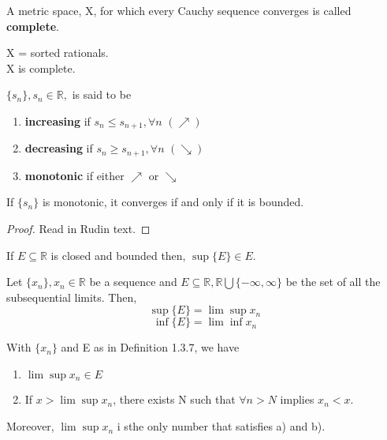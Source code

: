 \documentclass[11pt,fleqn]{book} %
\begin{document}
\begin{definition}[Complete]
	A metric space, X, for which every Cauchy sequence converges is called \textbf{complete}.
\end{definition}

\begin{example}
	X = sorted rationals.\\
	X is complete.
\end{example}

\begin{definition}
	$\{s_n\}, s_n \in \mathbb{R},$ is said to be
	\begin{enumerate}[label = \alph*)]
		\item \textbf{increasing} if $s_n \le s_{n+1}, \forall n$ $(\nearrow)$
		\item \textbf{decreasing} if $s_n \ge s_{n+1}, \forall n$ $(\searrow)$
		\item \textbf{monotonic} if either $\nearrow$ or $\searrow$
	\end{enumerate}
\end{definition}

\begin{theorem}
	If $\{s_n\}$ is monotonic, it converges if and only if it is bounded.
\end{theorem}

\begin{proof}
	Read in Rudin text.
\end{proof}

\begin{lemma}
	If $E \subseteq \mathbb{R}$ is closed and bounded then, $\sup \{E\} \in E$. 
\end{lemma}

\begin{definition}	
	Let $\{x_n\}, x_n \in \mathbb{R}$ be a sequence and $E \subseteq \mathbb{R}, \mathbb{R} \bigcup \{-\infty, \infty\}$ be the set of all the subsequential limits. Then, 
	$$\sup \{E\} = \lim\sup x_n $$
	$$\inf \{E\} = \lim\inf x_n $$
\end{definition}

\begin{theorem}
	With $\{x_n\}$ and E as in Definition 1.3.7, we have
	\begin{enumerate}[label = \alph*)]
		\item $\lim\sup x_n \in E$
		\item If $x > \lim\sup x_n$, there exists N such that $\forall n>N$ implies $x_n < x.$
	\end{enumerate}
	Moreover, $\lim\sup x_n$ i sthe only number that satisfies a) and b).
\end{theorem}
\end{document}
